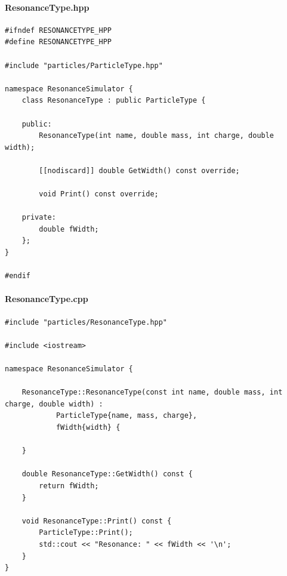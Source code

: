 \documentclass[12pt, a4paper]{article}
\begin{document}
\paragraph{ResonanceType.hpp}

\begin{verbatim}
#ifndef RESONANCETYPE_HPP
#define RESONANCETYPE_HPP

#include "particles/ParticleType.hpp"

namespace ResonanceSimulator {
    class ResonanceType : public ParticleType {

    public:
        ResonanceType(int name, double mass, int charge, double width);

        [[nodiscard]] double GetWidth() const override;

        void Print() const override;

    private:
        double fWidth;
    };
}

#endif
\end{verbatim}

\paragraph{ResonanceType.cpp}
\begin{verbatim}
#include "particles/ResonanceType.hpp"

#include <iostream>

namespace ResonanceSimulator {

    ResonanceType::ResonanceType(const int name, double mass, int charge, double width) :
            ParticleType{name, mass, charge},
            fWidth{width} {

    }

    double ResonanceType::GetWidth() const {
        return fWidth;
    }

    void ResonanceType::Print() const {
        ParticleType::Print();
        std::cout << "Resonance: " << fWidth << '\n';
    }
}
\end{verbatim}
\end{document}
